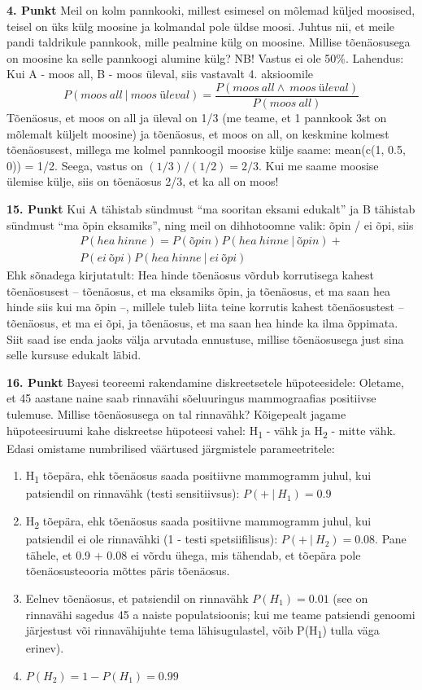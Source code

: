 \documentclass[]{book}
\begin{document}
\textbf{4. Punkt} Meil on kolm pannkooki, millest esimesel on mõlemad
küljed moosised, teisel on üks külg moosine ja kolmandal pole üldse
moosi. Juhtus nii, et meile pandi taldrikule pannkook, mille pealmine
külg on moosine. Millise tõenäosusega on moosine ka selle pannkoogi
alumine külg? NB! Vastus ei ole 50\%. Lahendus: Kui A - moos all, B -
moos üleval, siis vastavalt 4. aksioomile
\[P(moos~ all~ \lvert ~moos~üleval ) = \frac{P(moos~all \land ~moos~üleval)}{P(moos~all)}\]
Tõenäosus, et moos on all ja üleval on 1/3 (me teame, et 1 pannkook 3st
on mõlemalt küljelt moosine) ja tõenäosus, et moos on all, on keskmine
kolmest tõenäosusest, millega me kolmel pannkoogil moosise külje saame:
mean(c(1, 0.5, 0)) = 1/2. Seega, vastus on \((1/3)/(1/2) = 2/3\). Kui me
saame moosise ülemise külje, siis on tõenäosus 2/3, et ka all on moos!

\textbf{15. Punkt} Kui A tähistab sündmust ``ma sooritan eksami
edukalt'' ja B tähistab sündmust ``ma õpin eksamiks'', ning meil on
dihhotoomne valik: õpin / ei õpi, siis
\[\begin{array}{lcl} P(hea~hinne) = P(õpin)P(hea~hinne~ \lvert ~õpin) + \\P(ei~ õpi)P(hea~hinne~ \lvert ~ei~õpi) \end{array}\]
Ehk sõnadega kirjutatult: Hea hinde tõenäosus võrdub korrutisega kahest
tõenäosusest -- tõenäosus, et ma eksamiks õpin, ja tõenäosus, et ma saan
hea hinde siis kui ma õpin --, millele tuleb liita teine korrutis kahest
tõenäosustest -- tõenäosus, et ma ei õpi, ja tõenäosus, et ma saan hea
hinde ka ilma õppimata. Siit saad ise enda jaoks välja arvutada
ennustuse, millise tõenäosusega just sina selle kursuse edukalt läbid.

\textbf{16. Punkt} Bayesi teoreemi rakendamine diskreetsetele
hüpoteesidele: Oletame, et 45 aastane naine saab rinnavähi sõeluuringus
mammograafias positiivse tulemuse. Millise tõenäosusega on tal
rinnavähk? Kõigepealt jagame hüpoteesiruumi kahe diskreetse hüpoteesi
vahel: H\textsubscript{1} - vähk ja H\textsubscript{2} - mitte vähk.
Edasi omistame numbrilised väärtused järgmistele parameetritele:

\begin{enumerate}
\def\labelenumi{\arabic{enumi}.}
\item
  H\textsubscript{1} tõepära, ehk tõenäosus saada positiivne mammogramm
  juhul, kui patsiendil on rinnavähk (testi sensitiivsus):
  \(P( +~\vert~H_1) = 0.9\)
\item
  H\textsubscript{2} tõepära, ehk tõenäosus saada positiivne mammogramm
  juhul, kui patsiendil ei ole rinnavähki (1 - testi spetsiifilisus):
  \(P( +~\vert~H_2) = 0.08\). Pane tähele, et 0.9 + 0.08 ei võrdu ühega,
  mis tähendab, et tõepära pole tõenäosusteooria mõttes päris tõenäosus.
\item
  Eelnev tõenäosus, et patsiendil on rinnavähk \(P(H_1) = 0.01\) (see on
  rinnavähi sagedus 45 a naiste populatsioonis; kui me teame patsiendi
  genoomi järjestust või rinnavähijuhte tema lähisugulastel, võib
  P(H\textsubscript{1}) tulla väga erinev).
\item
  \(P(H_2) = 1 - P(H_1) = 0.99\)
\end{enumerate}
\end{document}
